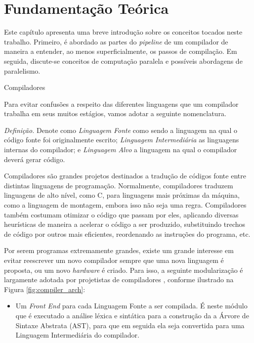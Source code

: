 \chapter{Fundamentação Teórica}

Este capítulo apresenta uma breve introdução sobre os conceitos tocados neste
trabalho. Primeiro, é abordado as partes do \textit{pipeline} de um compilador
de maneira a entender, ao menos superficialmente, os passos de compilação.
Em seguida, discute-se conceitos de computação paralela e possíveis abordagens
de paralelismo.

\begin{section}{Compiladores}

Para evitar confusões a respeito das diferentes linguagens que um compilador
trabalha em seus muitos estágios, vamos adotar a seguinte nomenclatura. 

\textit{Definição.} Denote como \textit{Linguagem Fonte} como sendo a linguagem
na qual o código fonte foi originalmente escrito;
\textit{Linguagem Intermediária} as linguagens internas do compilador; e
\textit{Linguagem Alvo} a linguagem na qual o compilador deverá gerar código.


Compiladores são grandes projetos destinados a tradução de códigos fonte
entre distintas linguagens de programação. Normalmente, compiladores traduzem
linguagens de alto nível, como C, para linguagens mais próximas da máquina,
como a linguagem de montagem, embora isso não seja uma regra.
Compiladores também costumam otimizar
o código que passam por eles, aplicando diversas heurísticas de
maneira a acelerar o código a ser produzido, substituindo trechos de código por 
outros mais eficientes, reordenando as instruções do programa, etc.

Por serem programas extremamente grandes, existe um grande interesse em evitar
reescrever um novo compilador 
sempre que uma nova linguagem é proposta, ou um novo \textit{hardware} é criado.
Para isso, a seguinte modularização é largamente adotada por projetistas de
compiladores \citep{redhat} \citep{llvm}, conforme ilustrado na Figura \ref{fig:compiler_arch}:

\begin{itemize}
    \item Um \textit{Front End} para cada Linguagem Fonte a ser compilada. 
	É neste módulo que é executado a análise léxica e sintática para a
construção da a Árvore de Sintaxe Abstrata (AST), para que em
seguida ela seja convertida para uma Linguagem Intermediária do compilador.


\end{itemize}
\end{section}
